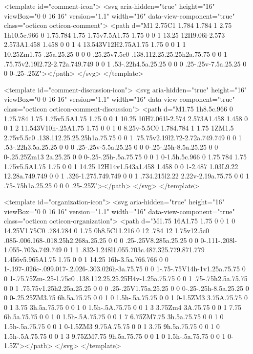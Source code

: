 {{<template id="comment-icon">
  <svg aria-hidden="true" height="16" viewBox="0 0 16 16" version="1.1" width="16" data-view-component="true" class="octicon octicon-comment">
    <path d="M1 2.75C1 1.784 1.784 1 2.75 1h10.5c.966 0 1.75.784 1.75 1.75v7.5A1.75 1.75 0 0 1 13.25 12H9.06l-2.573 2.573A1.458 1.458 0 0 1 4 13.543V12H2.75A1.75 1.75 0 0 1 1 10.25Zm1.75-.25a.25.25 0 0 0-.25.25v7.5c0 .138.112.25.25.25h2a.75.75 0 0 1 .75.75v2.19l2.72-2.72a.749.749 0 0 1 .53-.22h4.5a.25.25 0 0 0 .25-.25v-7.5a.25.25 0 0 0-.25-.25Z"></path>
</svg>
</template>

<template id="comment-discussion-icon">
  <svg aria-hidden="true" height="16" viewBox="0 0 16 16" version="1.1" width="16" data-view-component="true" class="octicon octicon-comment-discussion">
    <path d="M1.75 1h8.5c.966 0 1.75.784 1.75 1.75v5.5A1.75 1.75 0 0 1 10.25 10H7.061l-2.574 2.573A1.458 1.458 0 0 1 2 11.543V10h-.25A1.75 1.75 0 0 1 0 8.25v-5.5C0 1.784.784 1 1.75 1ZM1.5 2.75v5.5c0 .138.112.25.25.25h1a.75.75 0 0 1 .75.75v2.19l2.72-2.72a.749.749 0 0 1 .53-.22h3.5a.25.25 0 0 0 .25-.25v-5.5a.25.25 0 0 0-.25-.25h-8.5a.25.25 0 0 0-.25.25Zm13 2a.25.25 0 0 0-.25-.25h-.5a.75.75 0 0 1 0-1.5h.5c.966 0 1.75.784 1.75 1.75v5.5A1.75 1.75 0 0 1 14.25 12H14v1.543a1.458 1.458 0 0 1-2.487 1.03L9.22 12.28a.749.749 0 0 1 .326-1.275.749.749 0 0 1 .734.215l2.22 2.22v-2.19a.75.75 0 0 1 .75-.75h1a.25.25 0 0 0 .25-.25Z"></path>
</svg>
</template>

<template id="organization-icon">
  <svg aria-hidden="true" height="16" viewBox="0 0 16 16" version="1.1" width="16" data-view-component="true" class="octicon octicon-organization">
    <path d="M1.75 16A1.75 1.75 0 0 1 0 14.25V1.75C0 .784.784 0 1.75 0h8.5C11.216 0 12 .784 12 1.75v12.5c0 .085-.006.168-.018.25h2.268a.25.25 0 0 0 .25-.25V8.285a.25.25 0 0 0-.111-.208l-1.055-.703a.749.749 0 1 1 .832-1.248l1.055.703c.487.325.779.871.779 1.456v5.965A1.75 1.75 0 0 1 14.25 16h-3.5a.766.766 0 0 1-.197-.026c-.099.017-.2.026-.303.026h-3a.75.75 0 0 1-.75-.75V14h-1v1.25a.75.75 0 0 1-.75.75Zm-.25-1.75c0 .138.112.25.25.25H4v-1.25a.75.75 0 0 1 .75-.75h2.5a.75.75 0 0 1 .75.75v1.25h2.25a.25.25 0 0 0 .25-.25V1.75a.25.25 0 0 0-.25-.25h-8.5a.25.25 0 0 0-.25.25ZM3.75 6h.5a.75.75 0 0 1 0 1.5h-.5a.75.75 0 0 1 0-1.5ZM3 3.75A.75.75 0 0 1 3.75 3h.5a.75.75 0 0 1 0 1.5h-.5A.75.75 0 0 1 3 3.75Zm4 3A.75.75 0 0 1 7.75 6h.5a.75.75 0 0 1 0 1.5h-.5A.75.75 0 0 1 7 6.75ZM7.75 3h.5a.75.75 0 0 1 0 1.5h-.5a.75.75 0 0 1 0-1.5ZM3 9.75A.75.75 0 0 1 3.75 9h.5a.75.75 0 0 1 0 1.5h-.5A.75.75 0 0 1 3 9.75ZM7.75 9h.5a.75.75 0 0 1 0 1.5h-.5a.75.75 0 0 1 0-1.5Z"></path>
</svg>
</template>

}}
